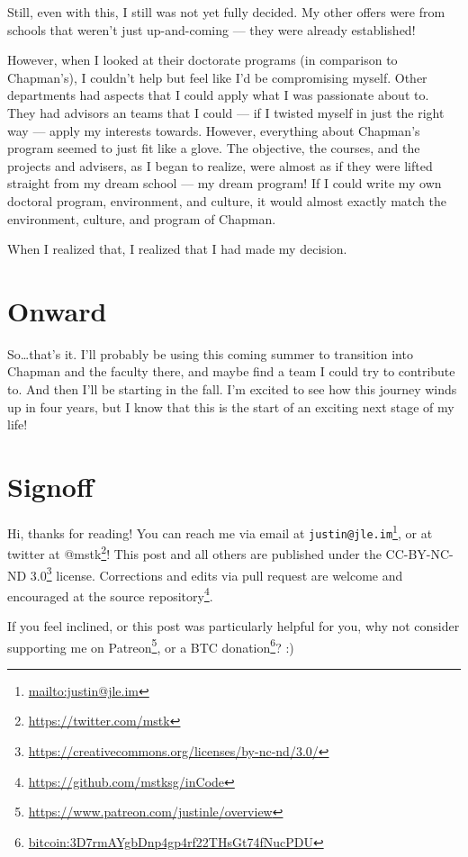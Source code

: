 \documentclass[]{article}
\renewcommand{\href}[2]{#2\footnote{\url{#1}}}
\begin{document}
Still, even with this, I still was not yet fully decided. My other offers were
from schools that weren't just up-and-coming --- they were already established!

However, when I looked at their doctorate programs (in comparison to Chapman's),
I couldn't help but feel like I'd be compromising myself. Other departments had
aspects that I could apply what I was passionate about to. They had advisors an
teams that I could --- if I twisted myself in just the right way --- apply my
interests towards. However, everything about Chapman's program seemed to just
fit like a glove. The objective, the courses, and the projects and advisers, as
I began to realize, were almost as if they were lifted straight from my dream
school --- my dream program! If I could write my own doctoral program,
environment, and culture, it would almost exactly match the environment,
culture, and program of Chapman.

When I realized that, I realized that I had made my decision.

\section{Onward}\label{onward}

So\ldots that's it. I'll probably be using this coming summer to transition into
Chapman and the faculty there, and maybe find a team I could try to contribute
to. And then I'll be starting in the fall. I'm excited to see how this journey
winds up in four years, but I know that this is the start of an exciting next
stage of my life!

\section{Signoff}\label{signoff}

Hi, thanks for reading! You can reach me via email at
\href{mailto:justin@jle.im}{\nolinkurl{justin@jle.im}}, or at twitter at
\href{https://twitter.com/mstk}{@mstk}! This post and all others are published
under the \href{https://creativecommons.org/licenses/by-nc-nd/3.0/}{CC-BY-NC-ND
3.0} license. Corrections and edits via pull request are welcome and encouraged
at \href{https://github.com/mstksg/inCode}{the source repository}.

If you feel inclined, or this post was particularly helpful for you, why not
consider \href{https://www.patreon.com/justinle/overview}{supporting me on
Patreon}, or a \href{bitcoin:3D7rmAYgbDnp4gp4rf22THsGt74fNucPDU}{BTC donation}?
:)
\end{document}
